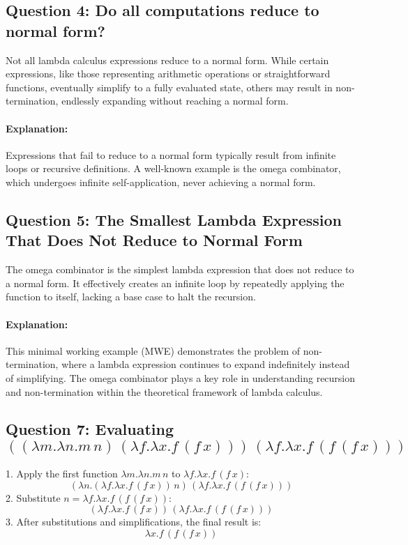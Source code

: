 \documentclass{article}
\theoremstyle{theorem}
\theoremstyle{definition}
\theoremstyle{remark}
\begin{document}
{\subsection*{Question 4: Do all computations reduce to normal form?}
Not all lambda calculus expressions reduce to a normal form. While certain expressions, like those representing arithmetic operations or straightforward functions, eventually simplify to a fully evaluated state, others may result in non-termination, endlessly expanding without reaching a normal form.

\paragraph{Explanation:}
Expressions that fail to reduce to a normal form typically result from infinite loops or recursive definitions. A well-known example is the omega combinator, which undergoes infinite self-application, never achieving a normal form.

\subsection*{Question 5: The Smallest Lambda Expression That Does Not Reduce to Normal Form}
The omega combinator is the simplest lambda expression that does not reduce to a normal form. It effectively creates an infinite loop by repeatedly applying the function to itself, lacking a base case to halt the recursion.

\paragraph{Explanation:}
This minimal working example (MWE) demonstrates the problem of non-termination, where a lambda expression continues to expand indefinitely instead of simplifying. The omega combinator plays a key role in understanding recursion and non-termination within the theoretical framework of lambda calculus.

\subsection*{Question 7: Evaluating \( ((\lambda m. \lambda n. m \, n) \, (\lambda f. \lambda x. f \, (f \, x))) \, (\lambda f. \lambda x. f \, (f \, (f \, x))) \)}
1. Apply the first function \( \lambda m. \lambda n. m \, n \) to \( \lambda f. \lambda x. f \, (f \, x) \):
   \[
   (\lambda n.(\lambda f.\lambda x.f \, (f \, x)) \, n) \, (\lambda f.\lambda x.f \, (f \, (f \, x)))
   \]
2. Substitute \( n = \lambda f.\lambda x.f \, (f \, (f \, x)) \):
   \[
   (\lambda f.\lambda x.f \, (f \, x)) \, (\lambda f.\lambda x.f \, (f \, (f \, x)))
   \]
3. After substitutions and simplifications, the final result is:
   \[
   \lambda x. f \, (f \, (f \, x))
   \]

}
\end{document}
